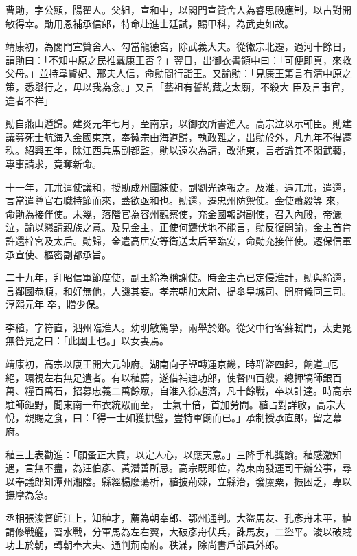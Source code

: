 \begin{pinyinscope}
 曹勛，字公顯，陽翟人。父組，宣和中，以閣門宣贊舍人為睿思殿應制，以占對開敏得幸。勛用恩補承信郎，特命赴進士廷試，賜甲科，為武吏如故。



 靖康初，為閣門宣贊舍人、勾當龍德宮，除武義大夫。從徽宗北遷，過河十餘日，謂勛曰：「不知中原之民推戴康王否？」翌日，出御衣書領中曰：「可便即真，來救父母。」並持韋賢妃、邢夫人信，命勛間行詣王。又諭勛：「見康王第言有清中原之策，悉舉行之，毋以我為念。」又言「藝祖有誓約藏之太廟，不殺大
 臣及言事官，違者不祥」



 勛自燕山遁歸。建炎元年七月，至南京，以御衣所書進入。高宗泣以示輔臣。勛建議募死士航海入金國東京，奉徽宗由海道歸，執政難之，出勛於外，凡九年不得遷秩。紹興五年，除江西兵馬副都監，勛以遠次為請，改浙東，言者論其不閑武藝，專事請求，竟奪新命。



 十一年，兀朮遣使議和，授勛成州團練使，副劉光遠報之。及淮，遇兀朮，遣還，言當遣尊官右職持節而來，蓋欲亟和也。勛還，遷忠州防禦使。金使蕭毅等
 來，命勛為接伴使。未幾，落階官為容州觀察使，充金國報謝副使，召入內殿，帝灑泣，諭以懇請親族之意。及見金主，正使何鑄伏地不能言，勛反復開諭，金主首肯許還梓宮及太后。勛歸，金遣高居安等衛送太后至臨安，命勛充接伴使。遷保信軍承宣使、樞密副都承旨。



 二十九年，拜昭信軍節度使，副王綸為稱謝使。時金主亮已定侵淮計，勛與綸還，言鄰國恭順，和好無他，人譏其妄。孝宗朝加太尉、提舉皇城司、開府儀同三司。淳熙元年
 卒，贈少保。



 李稙，字符直，泗州臨淮人。幼明敏篤學，兩舉於鄉。從父中行客蘇軾門，太史晁無咎見之曰：「此國士也。」以女妻焉。



 靖康初，高宗以康王開大元帥府。湖南向子諲轉運京畿，時群盜四起，餉道□厄絕，環視左右無足遣者。有以稙薦，遂借補迪功郎，使督四百艘，總押犒師銀百萬、糧百萬石，招募忠義二萬餘眾，自淮入徐趨濟，凡十餘戰，卒以計達。時高宗駐師鉅野，聞東南一布衣統眾而至，
 士氣十倍，首加勞問。稙占對詳敏，高宗大悅，親賜之食，曰：「得一士如獲拱璧，豈特軍餉而已。」承制授承直郎，留之幕府。



 稙三上表勸進：「願蚤正大寶，以定人心，以應天意。」三降手札獎諭。稙感激知遇，言無不盡，為汪伯彥、黃潛善所忌。高宗既即位，為東南發運司干辦公事，尋以奉議郎知潭州湘陰。縣經楊麼蕩析，稙披荊棘，立縣治，發廩粟，振困乏，專以撫摩為急。



 丞相張浚督師江上，知稙才，薦為朝奉郎、鄂州通判。大盜馬友、孔彥舟未平，稙
 請修戰艦，習水戰，分軍馬為左右翼，大破彥舟伏兵，誅馬友，二盜平。浚以破賊功上於朝，轉朝奉大夫、通判荊南府。秩滿，除尚書戶部員外郎。




\end{pinyinscope}
